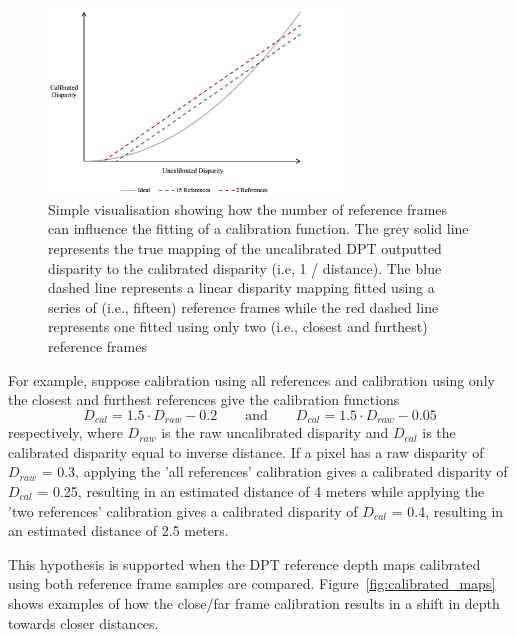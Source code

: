\begin{figure}[H]
    \centering
    \includegraphics[width=0.7\textwidth]{body/analysis/assets/calibration_effects/disparity_calibration}
    \caption{Simple visualisation showing how the number of reference frames can influence the fitting
        of a calibration function. The grey solid line represents the true mapping of the uncalibrated DPT
        outputted disparity to the calibrated disparity (i.e, 1 / distance). The blue dashed line represents
        a linear disparity mapping fitted using a series of (i.e., fifteen) reference frames while the red
        dashed line represents one fitted using only two (i.e., closest and furthest) reference frames}
    \label{fig:disparity_calibration}
\end{figure}

For example, suppose calibration using all references and calibration using only the closest and furthest
references give the calibration functions
\[
    D_{cal} = 1.5 \cdot D_{raw} - 0.2
    \qquad \mathrm{and} \qquad
    D_{cal} = 1.5 \cdot D_{raw} - 0.05
\]
respectively, where $D_{raw}$ is the raw uncalibrated disparity and $D_{cal}$ is the calibrated disparity
equal to inverse distance.
If a pixel has a raw disparity of $D_{raw}$ = 0.3, applying the 'all references' calibration gives a
calibrated disparity of $D_{cal}$ = 0.25, resulting in an estimated distance of 4 meters while applying
the 'two references' calibration gives a calibrated disparity of $D_{cal}$ = 0.4, resulting in an
estimated distance of 2.5 meters.

This hypothesis is supported when the DPT reference depth maps calibrated using both reference frame
samples are compared.
Figure~\ref{fig:calibrated_maps} shows examples of how the close/far frame calibration results in
a shift in depth towards closer distances.

